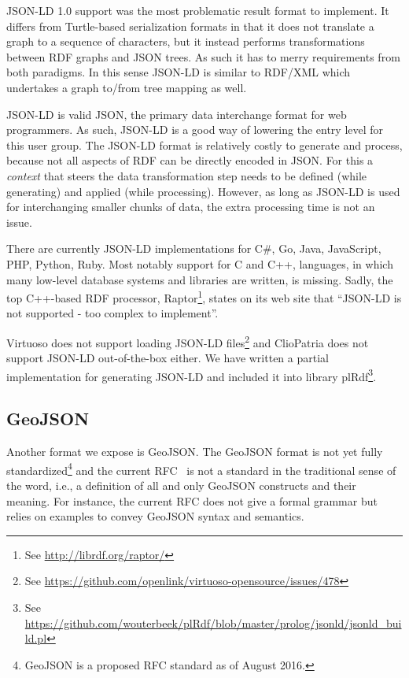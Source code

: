 \documentclass[a4paper]{scrartcl}
\newcommand{\seeUrl}[1]{\footnote{See \mbox{\url{#1}}}}
\begin{document}
JSON-LD 1.0 support was the most problematic result format to
implement.  It differs from Turtle-based serialization formats in that
it does not translate a graph to a sequence of characters, but it
instead performs transformations between RDF graphs and JSON trees.
As such it has to merry requirements from both paradigms.  In this
sense JSON-LD is similar to RDF/XML which undertakes a graph to/from
tree mapping as well.

JSON-LD is valid JSON, the primary data interchange format for web
programmers.  As such, JSON-LD is a good way of lowering the entry
level for this user group.  The JSON-LD format is relatively costly to
generate and process, because not all aspects of RDF can be directly
encoded in JSON.  For this a \emph{context} that steers the data
transformation step needs to be defined (while generating) and applied
(while processing).  However, as long as JSON-LD is used for
interchanging smaller chunks of data, the extra processing time is not
an issue.

There are currently JSON-LD implementations for C\#, Go, Java,
JavaScript, PHP, Python, Ruby.  Most notably support for C and C++,
languages, in which many low-level database systems and libraries are
written, is missing.  Sadly, the top C++-based RDF processor,
Raptor\seeUrl{http://librdf.org/raptor/}, states on its web site that
``JSON-LD is not supported - too complex to implement''.

Virtuoso does not support loading JSON-LD
files\seeUrl{https://github.com/openlink/virtuoso-opensource/issues/478}
and ClioPatria does not support JSON-LD out-of-the-box either.  We
have written a partial implementation for generating JSON-LD and
included it into library plRdf\seeUrl{https://github.com/wouterbeek/plRdf/blob/master/prolog/jsonld/jsonld_build.pl}.


\subsection{GeoJSON}
\label{sec:geojson}

Another format we expose is GeoJSON.  The GeoJSON format is not yet
fully standardized\footnote{GeoJSON is a proposed RFC standard as of
  August 2016.} and the current RFC~\cite{Butler2016} is not a
standard in the traditional sense of the word, i.e., a definition of
all and only GeoJSON constructs and their meaning.  For instance, the
current RFC does not give a formal grammar but relies on examples to
convey GeoJSON syntax and semantics.
\end{document}
